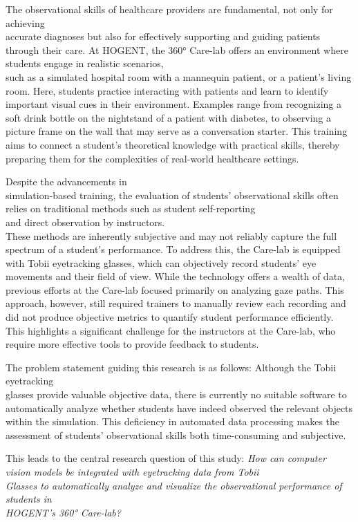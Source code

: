 \documentclass[english]{hogent-article}
\begin{document}
The observational skills of healthcare providers are fundamental, not only for achieving\\ accurate diagnoses but also for effectively supporting and guiding patients through their care.
At HOGENT, the 360° Care-lab offers an environment where students engage in realistic scenarios,\\ such as a simulated hospital room with a mannequin patient, or a patient's living room.
Here, students practice interacting with patients and learn to identify important visual cues in their environment.
Examples range from recognizing a soft drink bottle on the nightstand of a patient with diabetes, to observing a picture frame on the wall that may serve as a conversation starter.
This training aims to connect a student's theoretical knowledge with practical skills, thereby preparing them for the complexities of real-world healthcare settings.

Despite the advancements in\\ simulation-based training, the evaluation of students' observational skills often relies on traditional methods such as student self-reporting\\ and direct observation by instructors.\\
These methods are inherently subjective and may not reliably capture the full spectrum of a student's performance.
To address this, the Care-lab is equipped with Tobii eyetracking glasses, which can objectively record students' eye movements and their field of view. 
While the technology offers a wealth of data, previous efforts at the Care-lab focused primarily on analyzing gaze paths.
This approach, however, still required trainers to manually review each recording and did not produce objective metrics to quantify student performance efficiently.
This highlights a significant challenge for the instructors at the Care-lab, who require more effective tools to provide feedback to students.

The problem statement guiding this research is as follows: Although the Tobii eyetracking\\ glasses provide valuable objective data, there is currently no suitable software to automatically analyze whether
students have indeed observed the relevant objects within the simulation. This deficiency in automated data processing makes the assessment of students' observational skills both time-consuming and subjective.

This leads to the central research question of this study:
\textit{How can computer vision models be integrated with eyetracking data from Tobii\\ Glasses to automatically analyze and visualize the observational performance of students in\\ HOGENT's 360° Care-lab?}
\end{document}
